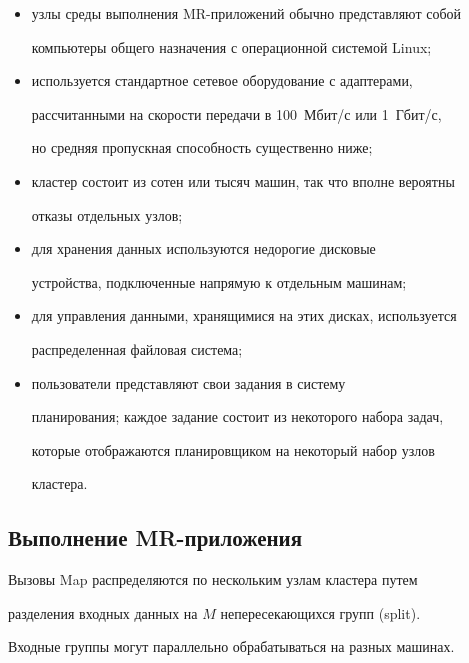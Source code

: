       \begin{itemize}


\item узлы среды выполнения MR-приложений обычно представляют собой 


компьютеры общего назначения с операционной системой Linux;


\item используется стандартное сетевое оборудование с адаптерами, 


рассчитанными на скорости передачи в 100~Мбит/с или 1~Гбит/с, 


но средняя пропускная способность существенно ниже;


\item кластер состоит из сотен или тысяч машин, так что вполне вероятны 


отказы отдельных узлов;


\item для хранения данных используются недорогие дисковые 


устройства, подключенные напрямую к отдельным машинам;


\item для управления данными, хранящимися на этих дисках, используется 


распределенная файловая система;


\item пользователи представляют свои задания в систему 


планирования; каждое задание состоит из некоторого набора задач, 


которые отображаются планировщиком на некоторый набор узлов 


кластера.


\end{itemize}





\subsection{Выполнение MR-приложения}


      


      Вызовы Map распределяются по нескольким узлам кластера путем 


разделения входных данных на $M$ непересекающихся групп (split). 


Входные группы могут параллельно обрабатываться на разных машинах. 


